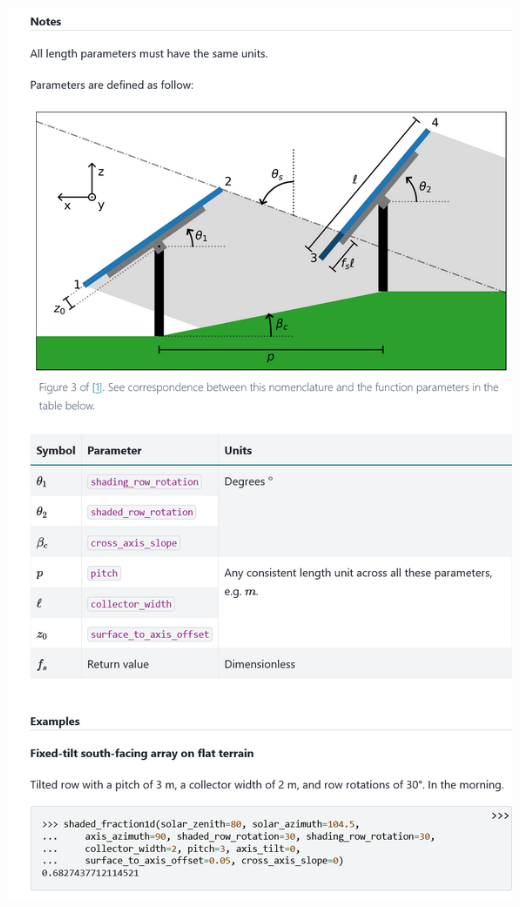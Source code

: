 \begin{myparindent}{0pt}
\includegraphics[width=\linewidth,height=0.9\textheight,keepaspectratio]{images/docs_funcs_cut/shaded_fraction1d_1.png}


\end{myparindent}

